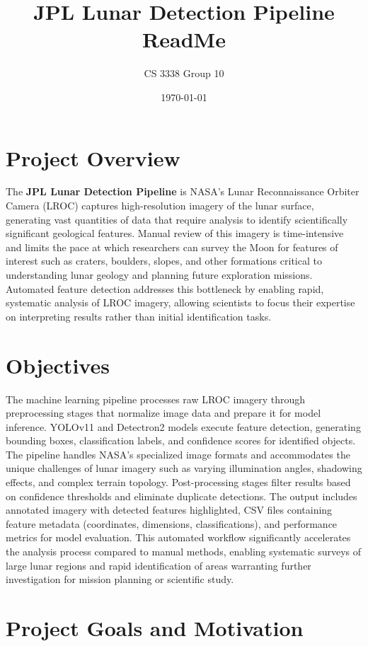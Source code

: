 \documentclass[12pt]{article}
\title{JPL Lunar Detection Pipeline \\ ReadMe}
\author{CS 3338 Group 10}
\date{\today}
\begin{document}
\maketitle
\tableofcontents
\newpage

\section{Project Overview}

The \textbf{JPL Lunar Detection Pipeline} is NASA's Lunar Reconnaissance Orbiter Camera (LROC) captures high-resolution imagery of the lunar surface, generating vast quantities of data that require analysis to identify scientifically significant geological features. Manual review of this imagery is time-intensive and limits the pace at which researchers can survey the Moon for features of interest such as craters, boulders, slopes, and other formations critical to understanding lunar geology and planning future exploration missions. Automated feature detection addresses this bottleneck by enabling rapid, systematic analysis of LROC imagery, allowing scientists to focus their expertise on interpreting results rather than initial identification tasks.


\section{Objectives}

The machine learning pipeline processes raw LROC imagery through preprocessing stages that normalize image data and prepare it for model inference. YOLOv11 and Detectron2 models execute feature detection, generating bounding boxes, classification labels, and confidence scores for identified objects. The pipeline handles NASA's specialized image formats and accommodates the unique challenges of lunar imagery such as varying illumination angles, shadowing effects, and complex terrain topology. Post-processing stages filter results based on confidence thresholds and eliminate duplicate detections. The output includes annotated imagery with detected features highlighted, CSV files containing feature metadata (coordinates, dimensions, classifications), and performance metrics for model evaluation. This automated workflow significantly accelerates the analysis process compared to manual methods, enabling systematic surveys of large lunar regions and rapid identification of areas warranting further investigation for mission planning or scientific study.


\section{Project Goals and Motivation}
\end{document}
